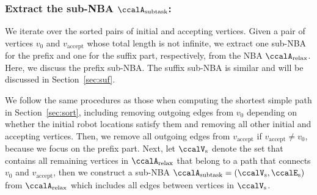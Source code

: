 \documentclass[Afour,sageh,times]{sagej}
\newcommand{\auto}[1]{\ccalA_{\text{#1}}}
\begin{document}


  \subsubsection{Extract the sub-NBA \upshape $\auto{subtask}$:}\label{sub-NBA:1}
We iterate over the sorted pairs of initial and accepting vertices. Given a pair of vertices  $v_0$ and $v_\text{accept}$ whose total length is not infinite,  we extract one sub-NBA for the prefix and one for the suffix part, respectively, from  the NBA $\auto{relax}$.  Here, we discuss the prefix sub-NBA. The suffix sub-NBA is similar and will be  discussed in Section~\ref{sec:suf}.

We follow the same procedures as those when computing the shortest simple path in Section~\ref{sec:sort}, including removing outgoing edges from $v_0$ depending on whether the initial robot locations satisfy them and removing all other initial and accepting vertices. Then, we remove all outgoing edges from $v_{\text{accept}}$ if $v_{\text{accept}} \not=v_0$, because we focus on the prefix part. Next, let $\ccalV_{\text{s}}$ denote the set that contains all remaining vertices in $ \auto{relax}$ that belong to a path that connects $v_0$ and $v_{\text{accept}}$, then we construct a sub-NBA $\auto{subtask}=(\ccalV_{\text{s}}, \ccalE_\text{s})$ from  $\auto{relax}$ which includes all edges between vertices in $\ccalV_{\text{s}}$. %
\end{document}
